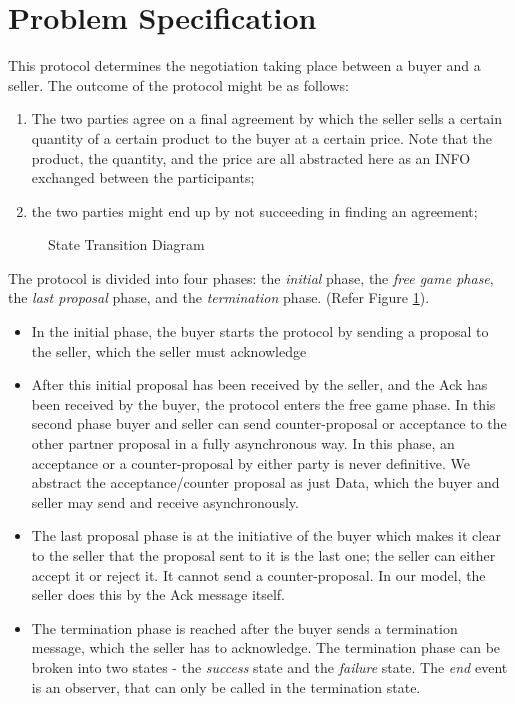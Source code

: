 \section{Problem Specification}
This protocol determines the negotiation taking place between a buyer and a seller. The outcome of the protocol might be as follows:
\begin{enumerate}
\item The two parties agree on a final agreement by which the seller sells a certain quantity
of a certain product to the buyer at a certain price. Note that the product, the
quantity, and the price are all abstracted here as an INFO exchanged between the
participants;
\item the two parties might end up by not succeeding in finding an agreement;
\end{enumerate}

\begin{figure}
\centering
{}
\caption{State Transition Diagram}
\label{statetransitions}
\end{figure}

The protocol is divided into four phases: the \emph{initial} phase, the \emph{free game phase}, the \emph{last proposal} phase, and the \emph{termination} phase. (Refer Figure \ref{statetransitions}). 

\begin{itemize}
\item In the initial phase, the buyer starts the protocol by sending a proposal to the seller, which the seller must acknowledge
\item After this initial proposal has been received by the seller, and the Ack has been received by the buyer, the protocol enters the free game phase. In this second phase buyer and seller can send counter-proposal or acceptance to the other partner proposal in a fully asynchronous way. In this phase, an acceptance or a counter-proposal by either party is never definitive. We abstract the acceptance/counter proposal as just Data, which the buyer and seller may send and receive asynchronously.
\item The last proposal phase is at the initiative of the buyer which makes it clear to the seller that the proposal sent to it is the last one; the seller can either accept it or reject it. It cannot send a counter-proposal. In our model, the seller does this by the Ack message itself.
\item The termination phase is reached after the buyer sends a termination message, which the seller has to acknowledge. The termination phase can be broken into two states - the \emph{success} state and the \emph{failure} state. The \emph{end} event is an observer, that can only be called in the termination state.
\end{itemize}

